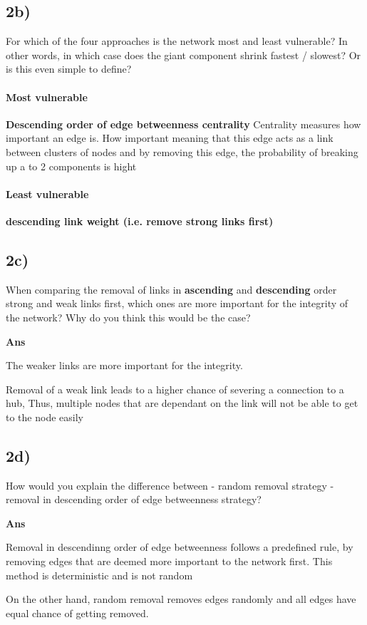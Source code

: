 \documentclass[11pt]{article}
\begin{document}
    \subsection{2b)}\label{b}

For which of the four approaches is the network most and least
vulnerable? In other words, in which case does the giant component
shrink fastest / slowest? Or is this even simple to define?

    \paragraph{Most vulnerable}\label{most-vulnerable}

\textbf{Descending order of edge betweenness centrality} Centrality
measures how important an edge is. How important meaning that this edge
acts as a link between clusters of nodes and by removing this edge, the
probability of breaking up a to 2 components is hight

\paragraph{Least vulnerable}\label{least-vulnerable}

\textbf{descending link weight (i.e. remove strong links first)}

    \subsection{2c)}\label{c}

When comparing the removal of links in \textbf{ascending} and
\textbf{descending} order strong and weak links first, which ones are
more important for the integrity of the network? Why do you think this
would be the case?

    \textbf{Ans}

The weaker links are more important for the integrity.

Removal of a weak link leads to a higher chance of severing a connection
to a hub, Thus, multiple nodes that are dependant on the link will not
be able to get to the node easily

    \subsection{2d)}\label{d}

How would you explain the difference between - random removal strategy -
removal in descending order of edge betweenness strategy?

    \textbf{Ans}

Removal in descendinng order of edge betweenness follows a predefined
rule, by removing edges that are deemed more important to the network
first. This method is deterministic and is not random

On the other hand, random removal removes edges randomly and all edges
have equal chance of getting removed.


    
    
    
    
\end{document}
